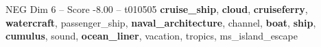 \begin{textsample}{NEG Dim 6 – Score -8.00 – t010505}  \label{ex:f6_neg_040}
\textbf{cruise\_ship}, \textbf{cloud}, \textbf{cruiseferry}, \textbf{watercraft}, passenger\_ship, \textbf{naval\_architecture}, channel, \textbf{boat}, \textbf{ship}, \textbf{cumulus}, sound, \textbf{ocean\_liner}, vacation, tropics, ms\_island\_escape

\end{textsample}
